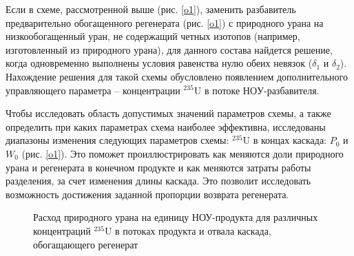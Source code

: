 Если в схеме, рассмотренной выше (рис. \ref{o1}), заменить разбавитель предварительно обогащенного регенерата (рис. \ref{o1}) с природного урана на низкообогащенный уран, не содержащий четных изотопов (например, изготовленный из природного урана), для данного состава найдется решение, когда одновременно выполнены условия равенства нулю обеих невязок ($\delta_1$ и $\delta_2$). Нахождение решения для такой схемы обусловлено появлением дополнительного управляющего параметра -- концентрации $^{235}$U в потоке $НОУ$-разбавителя.

Чтобы исследовать область допустимых значений параметров схемы, а также определить при каких параметрах схема наиболее эффективна, исследованы диапазоны изменения следующих параметров схемы: $^{235}$U в концах каскада: $P_0$ и $W_0$ (рис. \ref{o1}). Это поможет проиллюстрировать как меняются доли природного урана и регенерата в конечном продукте и как меняются затраты работы разделения, за счет изменения длины каскада. Это позволит исследовать возможность достижения заданной пропорции возврата регенерата. 

\begin{figure}[ht]
  \caption{Расход природного урана на единицу НОУ-продукта  для различных концентраций $^{235}$U в потоках продукта и отвала каскада, обогащающего регенерат}\label{fig:sc2_2}
\end{figure}

